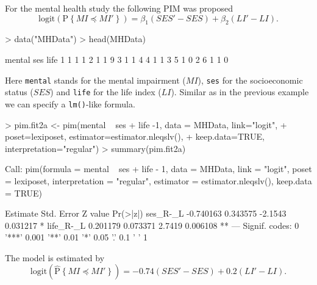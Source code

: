 \documentclass[12pt]{article}
\newcommand{\prob}[1]{\text{P}\left\{#1\right\}}
\newcommand{\hatprob}[1]{\hat{\text{P}}\left\{#1\right\}}
\newcommand{\leqs}{\preccurlyeq}
\begin{document}
For the mental health study the following PIM was proposed
\begin{equation}\label{pim.mhs}
\text{logit}\left(\prob{MI \leqs MI'} \right) = \beta_1 (SES' - SES) + \beta_2 (LI' - LI). 
\end{equation}
\begin{Schunk}
\begin{Sinput}
> data("MHData")
> head(MHData)
\end{Sinput}
\begin{Soutput}
  mental ses life
1      1   1    1
2      1   1    9
3      1   1    4
4      1   1    3
5      1   0    2
6      1   1    0
\end{Soutput}
\end{Schunk}
Here \verb|mental| stands for the mental impairment ($MI$), \verb|ses| for the socioeconomic status ($SES$) and \verb|life| for the life index ($LI$). Similar as in the previous example we can specify a \texttt{lm()}-like formula. 
\begin{Schunk}
\begin{Sinput}
> pim.fit2a <- pim(mental ~ ses + life -1, data = MHData, link="logit", 
+   poset=lexiposet, estimator=estimator.nleqslv(), 
+   keep.data=TRUE, interpretation="regular")
> summary(pim.fit2a)
\end{Sinput}
\begin{Soutput}
Call:
pim(formula = mental ~ ses + life - 1, data = MHData, link = "logit", 
    poset = lexiposet, interpretation = "regular", estimator = estimator.nleqslv(), 
    keep.data = TRUE)

           Estimate Std. Error Z value Pr(>|z|)   
ses_R-_L  -0.740163   0.343575 -2.1543 0.031217 * 
life_R-_L  0.201179   0.073371  2.7419 0.006108 **
---
Signif. codes:  0 '***' 0.001 '**' 0.01 '*' 0.05 '.' 0.1 ' ' 1 
\end{Soutput}
\end{Schunk}
The model is estimated by
\[
\text{logit}\left(\hatprob{MI \leqs MI'} \right) = -0.74 (SES' - SES) + 0.2 (LI' - LI). 
\]
\end{document}
